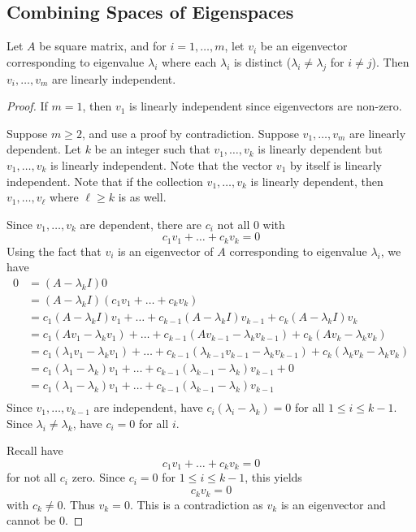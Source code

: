 \documentclass{article}
\begin{document}
\subsection{Combining Spaces of Eigenspaces}
\begin{theorem}
  Let $A$ be square matrix, and for $i = 1, \ldots, m$, let $v_i$ be an eigenvector corresponding to eigenvalue $\lambda_i$ where each $\lambda_i$ is distinct ($\lambda_i \neq \lambda_j$ for $i \neq j$). Then $v_i, \ldots, v_m$ are linearly independent.
\end{theorem}
\begin{proof}
  If $m = 1$, then $v_1$ is linearly independent since eigenvectors are non-zero.

  Suppose $m \geq 2$, and use a proof by contradiction. Suppose $v_1, \ldots, v_m$ are linearly dependent. Let $k$ be an integer such that $v_1, \ldots, v_k$ is linearly dependent but $v_1, \ldots, v_k$ is linearly independent. Note that the vector $v_1$ by itself is linearly independent. Note that if the collection $v_1, \ldots, v_k$ is linearly dependent, then $v_1, \ldots, v_\ell$ where $\ell \geq k$ is as well.

  Since $v_1, \ldots, v_k$ are dependent, there are $c_i$ not all $0$ with \[
    c_1v_1 + \dots + c_kv_k = 0
  \]
  Using the fact that $v_i$ is an eigenvector of $A$ corresponding to eigenvalue $\lambda_i$, we have
  \begin{align*}
    0 & = (A - \lambda_kI)0                                                                                                              \\
      & = (A - \lambda_kI)(c_1v_1 + \dots + c_kv_k)                                                                                      \\
      & = c_1(A - \lambda_kI)v_1 + \dots + c_{k-1}(A - \lambda_kI)v_{k-1} + c_k(A - \lambda_kI)v_k                                       \\
      & = c_1(Av_1 - \lambda_kv_1) + \dots + c_{k-1}(Av_{k-1} - \lambda_kv_{k-1}) + c_k(Av_k - \lambda_kv_k)                             \\
      & = c_1(\lambda_1v_1 - \lambda_kv_1) + \dots + c_{k-1}(\lambda_{k-1}v_{k-1} - \lambda_kv_{k-1}) + c_k(\lambda_kv_k - \lambda_kv_k) \\
      & = c_1(\lambda_1 - \lambda_k)v_1 + \dots + c_{k-1}(\lambda_{k-1} - \lambda_k)v_{k-1} + 0                                          \\
      & = c_1(\lambda_1 - \lambda_k)v_1 + \dots + c_{k-1}(\lambda_{k-1} - \lambda_k)v_{k-1}                                              \\
  \end{align*}
  Since $v_1, \ldots, v_{k-1}$ are independent, have $c_i(\lambda_i - \lambda_k) = 0$ for all $1 \leq i \leq k-1$. Since $\lambda_i \neq \lambda_k$, have $c_i = 0$ for all $i$.

  Recall have \[
    c_1v_1 + \dots + c_kv_k = 0
  \] for not all $c_i$ zero. Since $c_i = 0$ for $1 \leq i \leq k-1$, this yields \[
    c_kv_k = 0
  \] with $c_k \neq 0$. Thus $v_k = 0$. This is a contradiction as $v_k$ is an eigenvector and cannot be $0$.
\end{proof}
\end{document}
